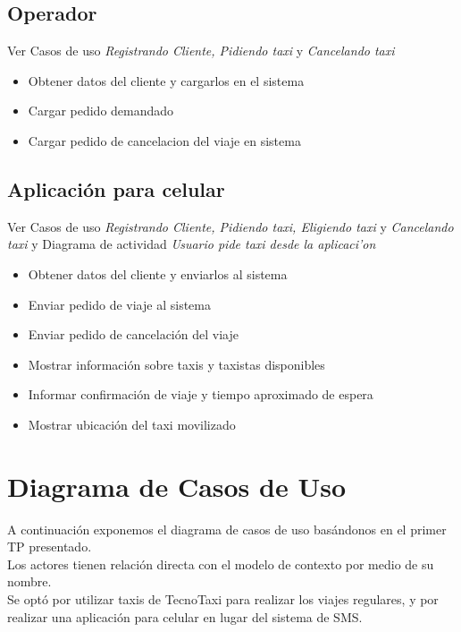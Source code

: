 \documentclass[a4paper]{article}
\begin{document}
\subsection{Operador}
Ver Casos de uso \textit{Registrando Cliente, Pidiendo taxi} y \textit{Cancelando taxi}
\begin{itemize}
\item Obtener datos del cliente y cargarlos en el sistema
\item Cargar pedido demandado
\item Cargar pedido de cancelacion del viaje en sistema
\end{itemize}

\subsection{Aplicaci\'on para celular}
Ver Casos de uso \textit{Registrando Cliente, Pidiendo taxi, Eligiendo taxi} y \textit{Cancelando taxi} y
Diagrama de actividad \textit{Usuario pide taxi desde la aplicaci'on}
\begin{itemize}
\item Obtener datos del cliente y enviarlos al sistema
\item Enviar pedido de viaje al sistema
\item Enviar pedido de cancelaci\'on del viaje
\item Mostrar informaci\'on sobre taxis y taxistas disponibles
\item Informar confirmaci\'on de viaje y tiempo aproximado de espera
\item Mostrar ubicaci\'on del taxi movilizado
\end{itemize}

\newpage
\section{Diagrama de Casos de Uso}

A continuaci\'on exponemos el diagrama de casos de uso bas\'andonos en el primer TP presentado. \\
Los actores tienen relaci\'on directa con el modelo de contexto por medio de su nombre.\\
Se opt\'o por utilizar taxis de TecnoTaxi para realizar los viajes regulares, y por realizar una aplicaci\'on para celular en lugar del sistema de SMS.
\bigskip
\end{document}
